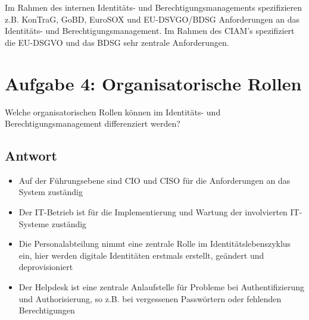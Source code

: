 \documentclass[11pt]{article}
\begin{document}
Im Rahmen des internen Identitäts- und Berechtigungsmanagements spezifizieren z.B. KonTraG, GoBD, EuroSOX und EU-DSVGO/BDSG Anforderungen an das Identitäts- und Berechtigungsmanagement. Im Rahmen des CIAM's spezifiziert die EU-DSGVO und das BDSG sehr zentrale Anforderungen.

\section*{Aufgabe 4: Organisatorische Rollen}
Welche organisatorischen Rollen können im Identitäts- und Berechtigungsmanagement differenziert werden?
\subsection*{Antwort}
\begin{itemize}
    \item Auf der Führungsebene sind CIO und CISO für die Anforderungen an das System zuständig
    \item Der IT-Betrieb ist für die Implementierung und Wartung der involvierten IT-Systeme zuständig
    \item Die Personalabteilung nimmt eine zentrale Rolle im Identitätslebenszyklus ein, hier werden digitale Identitäten erstmals erstellt, geändert und deprovisioniert
    \item Der Helpdesk ist eine zentrale Anlaufstelle für Probleme bei Authentifizierung und Authorisierung, so z.B. bei vergessenen Passwörtern oder fehlenden Berechtigungen
\end{itemize}
\end{document}
